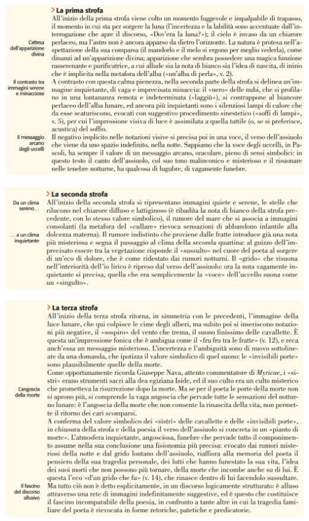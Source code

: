 \documentclass[a4paper, twoside, titlepage]{book}
\begin{document}
\begin{center}
\includegraphics[width=\textwidth]{assiuolo2}
\end{center}
\vfill
\begin{center}
\includegraphics[width=\textwidth]{assiuolo3}
\end{center}

\begin{center}
\includegraphics[width=\textwidth]{assiuolo4}
\end{center}
\end{document}
